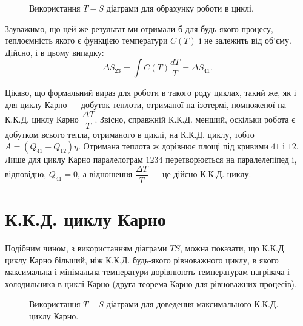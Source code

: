 \begin{figure}[h!]\centering
    
\caption{Використання $T-S$ діаграми для обрахунку роботи в циклі.}
\label{pic:3.6}
\end{figure}

Зауважимо, що цей же результат ми отримали б для будь-якого процесу, теплоємність якого є функцією температури $C(T)$ і не залежить від об'єму. Дійсно, і в цьому випадку:
\begin{equation*}
   \Delta S_{23} = \int C(T)\dfrac{dT}{T} = \Delta S_{41}.
\end{equation*}

Цікаво, що формальний вираз для роботи в такого роду циклах, такий же, як і для циклу Карно ---
добуток теплоти, отриманої на ізотермі, помноженої на К.К.Д. циклу Карно $\dfrac{\Delta T}{T}$.
Звісно, справжній
К.К.Д. менший, оскільки робота є добутком всього тепла, отриманого в циклі, на К.К.Д. циклу, тобто $A =
(Q_{41}+Q_{12})\eta$. Отримана теплота ж дорівнює площі під кривими $41$ і $12$. Лише для циклу Карно
паралелограм $1234$ перетворюється на паралелепіпед і, відповідно, $Q_{41}=0$, а відношення
$\dfrac{\Delta T}{T}$ --- це дійсно К.К.Д. циклу.

\section{К.К.Д. циклу Карно}

Подібним чином, з використанням діаграми $TS$, можна показати, що К.К.Д. циклу Карно більший, ніж
К.К.Д. будь-якого рівноважного циклу, в якого максимальна і мінімальна температури дорівнюють
температурам нагрівача і холодильника в циклі Карно (друга теорема Карно для рівноважних процесів).

\begin{figure}[h!]\centering
    
\caption{Використання $T-S$ діаграми для доведення максимального К.К.Д. циклу Карно.}
\label{pic:3.7}
\end{figure}


